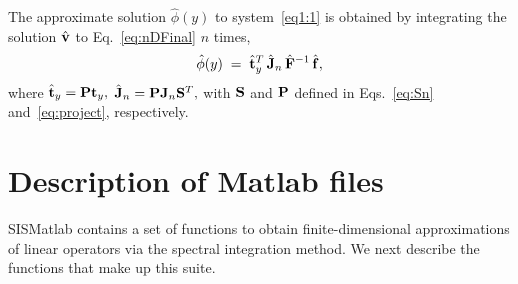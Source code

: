\documentclass[%
secnumarabic,%
 amssymb, amsmath,%
 aps,prf,superscriptaddress,longbibliography
frontmatterverbose,
]{revtex4-2}
\begin{document}
The approximate solution $\hat{\phi} (y)$ to system~\eqref{eq1:1} is obtained by integrating the solution $\hat{\mathbf{v}}$ to Eq.~\eqref{eq:nDFinal} $n$ times,
$$
	\hat{\phi} (y) 
	\; = \; 
	\hat{\mathbf{t}}_y^T \, \hat{\mathbf{J}}_n \, \hat{\mathbf{F}}^{-1} \, \hat{\mathbf{f}},
$$ 
where
	$
	\hat{\mathbf{t}}_y = \mathbf{P} \mathbf{t}_y,
	$	 
	$
	\hat {\mathbf{J}}_n = \mathbf{P} \mathbf J_n \mathbf{S}^T,
	$
with $\mathbf{S}$ and $\mathbf{P}$ defined in Eqs.~\eqref{eq:Sn} and~\eqref{eq:project}, respectively.

	\vspace*{-3ex}
\section{Description of Matlab files}
	\label{sec.matlab}

	\vspace*{-2ex}
{\sf SISMatlab} contains a set of functions to obtain finite-dimensional approximations of linear operators via the spectral integration method. We next describe the functions that make up this suite. 
\end{document}
